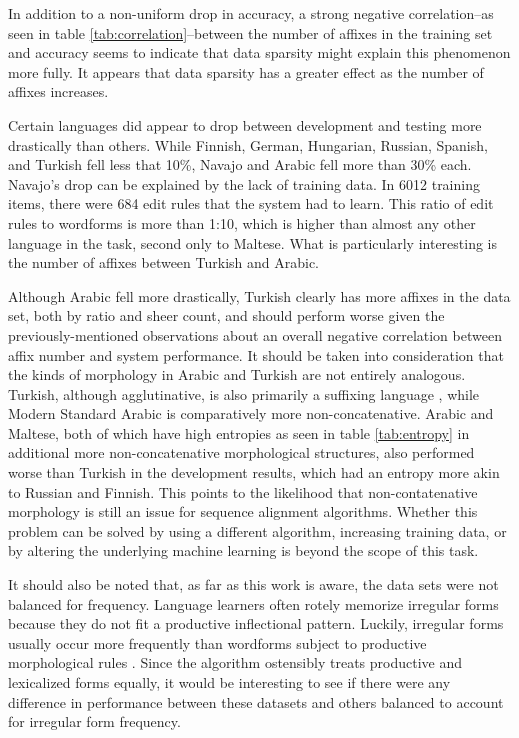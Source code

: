 \documentclass[11pt]{article}
\begin{document}
In addition to a non-uniform drop in accuracy, a strong negative correlation--as seen in table \ref{tab:correlation}--between the number of affixes in the training set and accuracy seems to indicate that data sparsity might explain this phenomenon more fully.
It appears that data sparsity has a greater effect as the number of affixes increases. 

Certain languages did appear to drop between development and testing more drastically than others. 
While Finnish, German, Hungarian, Russian, Spanish, and Turkish fell less that 10\%, Navajo and Arabic fell more than 30\% each. 
Navajo's drop can be explained by the lack of training data. In 6012 training items, there were 684 edit rules that the system had to learn. 
This ratio of edit rules to wordforms is more than 1:10, which is higher than almost any other language in the task, second only to Maltese. 
What is particularly interesting is the number of affixes between Turkish and Arabic. 

Although Arabic fell more drastically, Turkish clearly has more affixes in the data set, both by ratio and sheer count, and should perform worse given the previously-mentioned observations about an overall negative correlation between affix number and system performance. 
It should be taken into consideration that the kinds of morphology in Arabic and Turkish are not entirely analogous.
Turkish, although agglutinative, is also primarily a suffixing language \cite{lewis2000turkish}, while Modern Standard Arabic is comparatively more non-concatenative. 
Arabic and Maltese, both of which have high entropies as seen in table \ref{tab:entropy} in additional more non-concatenative morphological structures, also performed worse than Turkish in the development results, which had an entropy more akin to Russian and Finnish.
This points to the likelihood that non-contatenative morphology is still an issue for sequence alignment algorithms.
Whether this problem can be solved by using a different algorithm, increasing training data, or by altering the underlying machine learning is beyond the scope of this task.

It should also be noted that, as far as this work is aware, the data sets were not balanced for frequency. 
Language learners often rotely memorize irregular forms because they do not fit a productive inflectional pattern.
Luckily, irregular forms usually occur more frequently than wordforms subject to productive morphological rules \cite{bybee1997three,grabowski1995corpus}.
Since the algorithm ostensibly treats productive and lexicalized forms equally, it would be interesting to see if there were any difference in performance between these datasets and others balanced to account for irregular form frequency.
\end{document}
